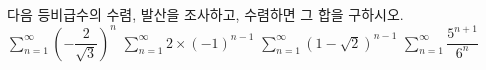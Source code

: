 다음 등비급수의 수렴, 발산을 조사하고, 수렴하면 그 합을 구하시오.
 $\displaystyle\sum_{n=1}^{\infty}\left(-\dfrac{2}{\sqrt{3}}\right)^{n}$
 $\displaystyle\sum_{n=1}^{\infty}2\times(-1)^{n-1}$
 $\displaystyle\sum_{n=1}^{\infty}(1-\sqrt{2})^{n-1}$
 $\displaystyle\sum_{n=1}^{\infty}\dfrac{5^{n+1}}{6^{n}}$

